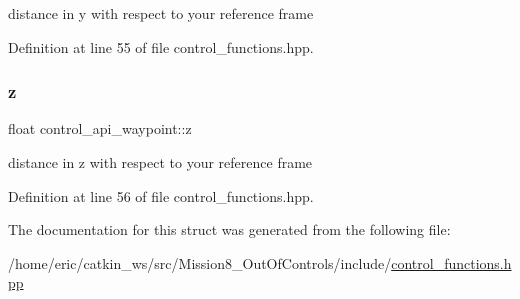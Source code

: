 distance in y with respect to your reference frame 



Definition at line 55 of file control\+\_\+functions.\+hpp.

\mbox{\label{structcontrol__api__waypoint_af77b8d62f18d1b4c1884b46147751b49}} 
\subsubsection{\texorpdfstring{z}{z}}
{\footnotesize\ttfamily float control\+\_\+api\+\_\+waypoint\+::z}



distance in z with respect to your reference frame 



Definition at line 56 of file control\+\_\+functions.\+hpp.



The documentation for this struct was generated from the following file\+:\begin{DoxyCompactItemize}
\item 
/home/eric/catkin\+\_\+ws/src/\+Mission8\+\_\+\+Out\+Of\+Controls/include/\mbox{\hyperlink{control__functions_8hpp}{control\+\_\+functions.\+hpp}}\end{DoxyCompactItemize}
